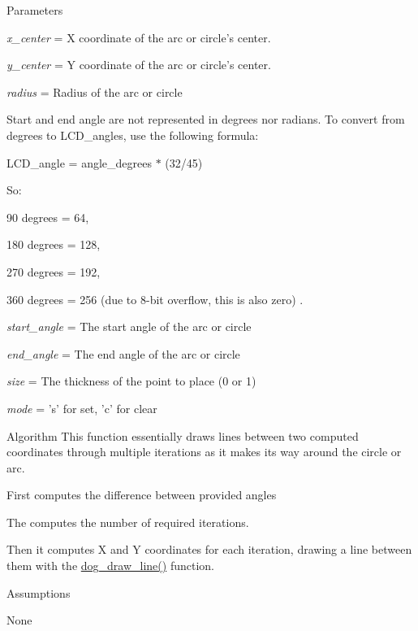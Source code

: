 \begin{DoxyParagraph}{Parameters}

\begin{DoxyItemize}
\item {\itshape x\-\_\-center} = X coordinate of the arc or circle's center.
\item {\itshape y\-\_\-center} = Y coordinate of the arc or circle's center.
\item {\itshape radius} = Radius of the arc or circle

Start and end angle are not represented in degrees nor radians. To convert from degrees to L\-C\-D\-\_\-angles, use the following formula\-: \par
 L\-C\-D\-\_\-angle = angle\-\_\-degrees $\ast$ (32/45) \par
 So\-: \par
 90 degrees = 64, \par
 180 degrees = 128, \par
 270 degrees = 192, \par
 360 degrees = 256 (due to 8-\/bit overflow, this is also zero) .\par

\item {\itshape start\-\_\-angle} = The start angle of the arc or circle
\item {\itshape end\-\_\-angle} = The end angle of the arc or circle \par
 \par
 \par

\item {\itshape size} = The thickness of the point to place (0 or 1)
\item {\itshape mode} = 's' for set, 'c' for clear
\end{DoxyItemize}
\end{DoxyParagraph}
\begin{DoxyParagraph}{Algorithm}
This function essentially draws lines between two computed coordinates through multiple iterations as it makes its way around the circle or arc.
\begin{DoxyItemize}
\item First computes the difference between provided angles
\item The computes the number of required iterations.
\item Then it computes X and Y coordinates for each iteration, drawing a line between them with the \hyperlink{group___d_o_g_m128__lines_gaa65019b0ad1777d5f315e28faf9c703b}{dog\-\_\-draw\-\_\-line()} function.
\end{DoxyItemize}
\end{DoxyParagraph}
\begin{DoxyParagraph}{Assumptions}

\begin{DoxyItemize}
\item None 
\end{DoxyItemize}
\end{DoxyParagraph}
